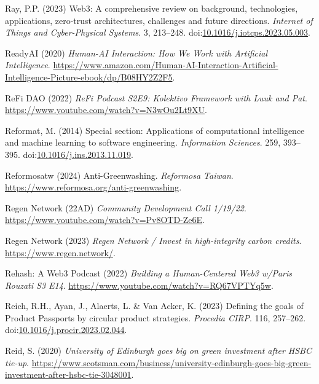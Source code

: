 \documentclass[
  letterpaper,
  DIV=11,
  numbers=noendperiod]{scrartcl}
\newlength{\cslhangindent}
\newenvironment{CSLReferences}[2] %
 {\begin{list}{}{%
  \setlength{\itemindent}{0pt}
  \setlength{\leftmargin}{0pt}
  \setlength{\parsep}{0pt}
  \ifodd #1
   \setlength{\leftmargin}{\cslhangindent}
   \setlength{\itemindent}{-1\cslhangindent}
  \fi
  \setlength{\itemsep}{#2\baselineskip}}}
 {\end{list}}
\begin{document}
\begin{CSLReferences}{0}{1}
Ray, P.P. (2023) Web3: {A} comprehensive review on background,
technologies, applications, zero-trust architectures, challenges and
future directions. \emph{Internet of Things and Cyber-Physical Systems}.
3, 213--248.
doi:\href{https://doi.org/10.1016/j.iotcps.2023.05.003}{10.1016/j.iotcps.2023.05.003}.

ReadyAI (2020) \emph{Human-{AI Interaction}: {How We Work} with
{Artificial Intelligence}}.
\url{https://www.amazon.com/Human-AI-Interaction-Artificial-Intelligence-Picture-ebook/dp/B08HY2Z2F5}.

ReFi DAO (2022) \emph{{ReFi Podcast S2E9}: {Kolektivo Framework} with
{Luuk} and {Pat}}. \url{https://www.youtube.com/watch?v=N3wOu2Lt9XU}.

Reformat, M. (2014) Special section: {Applications} of computational
intelligence and machine learning to software engineering.
\emph{Information Sciences}. 259, 393--395.
doi:\href{https://doi.org/10.1016/j.ins.2013.11.019}{10.1016/j.ins.2013.11.019}.

Reformosatw (2024) Anti-{Greenwashing}. \emph{Reformosa Taiwan}.
\url{https://www.reformosa.org/anti-greenwashing}.

Regen Network (22AD) \emph{Community {Development Call} 1/19/22}.
\url{https://www.youtube.com/watch?v=Pv8OTD-Ze6E}.

Regen Network (2023) \emph{Regen {Network} / {Invest} in high-integrity
carbon credits}. \url{https://www.regen.network/}.

Rehash: A Web3 Podcast (2022) \emph{Building a {Human-Centered Web3}
w/{Paris Rouzati} {\textbar} {S3 E14}}.
\url{https://www.youtube.com/watch?v=RQ67VPTYq5w}.

Reich, R.H., Ayan, J., Alaerts, L. \& Van Acker, K. (2023) Defining the
goals of {Product Passports} by circular product strategies.
\emph{Procedia CIRP}. 116, 257--262.
doi:\href{https://doi.org/10.1016/j.procir.2023.02.044}{10.1016/j.procir.2023.02.044}.

Reid, S. (2020) \emph{University of {Edinburgh} goes big on green
investment after {HSBC} tie-up}.
\url{https://www.scotsman.com/business/university-edinburgh-goes-big-green-investment-after-hsbc-tie-3048001}.


\end{CSLReferences}
\end{document}
